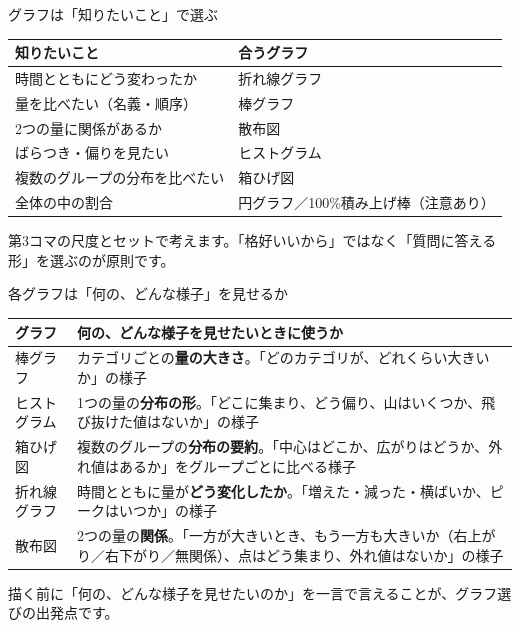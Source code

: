 \documentclass[aspectratio=169,11pt]{beamer}
\begin{document}
\begin{frame}{グラフは「知りたいこと」で選ぶ}
\begin{center}
\begin{tabular}{lp{8.6cm}}
\toprule
知りたいこと & 合うグラフ \\
\midrule
時間とともにどう変わったか & 折れ線グラフ \\
量を比べたい（名義・順序） & 棒グラフ \\
2つの量に関係があるか & 散布図 \\
ばらつき・偏りを見たい & ヒストグラム \\
複数のグループの分布を比べたい & 箱ひげ図 \\
全体の中の割合 & 円グラフ／100\%積み上げ棒（注意あり） \\
\bottomrule
\end{tabular}
\end{center}
第3コマの尺度とセットで考えます。「格好いいから」ではなく「質問に答える形」を選ぶのが原則です。
\end{frame}

\begin{frame}{各グラフは「何の、どんな様子」を見せるか}
\begin{center}
\begin{tabular}{lp{9.6cm}}
\toprule
グラフ & 何の、どんな様子を見せたいときに使うか \\
\midrule
棒グラフ & カテゴリごとの\textbf{量の大きさ}。「どのカテゴリが、どれくらい大きいか」の様子 \\
ヒストグラム & 1つの量の\textbf{分布の形}。「どこに集まり、どう偏り、山はいくつか、飛び抜けた値はないか」の様子 \\
箱ひげ図 & 複数のグループの\textbf{分布の要約}。「中心はどこか、広がりはどうか、外れ値はあるか」をグループごとに比べる様子 \\
折れ線グラフ & 時間とともに量が\textbf{どう変化したか}。「増えた・減った・横ばいか、ピークはいつか」の様子 \\
散布図 & 2つの量の\textbf{関係}。「一方が大きいとき、もう一方も大きいか（右上がり／右下がり／無関係）、点はどう集まり、外れ値はないか」の様子 \\
\bottomrule
\end{tabular}
\end{center}
\vspace{0.3em}
描く前に「何の、どんな様子を見せたいのか」を一言で言えることが、グラフ選びの出発点です。
\end{frame}
\end{document}
